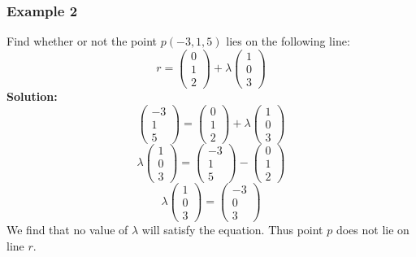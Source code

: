 \documentclass[hidelinks, a4paper, 12pt]{article}
\newcommand{\bd}{\textbf}
\begin{document}
            \subsubsection{Example 2}
                Find whether or not the point $p(-3, 1, 5)$ lies on the following line:
                \[r = \begin{pmatrix} 0 \\ 1 \\ 2 \end{pmatrix} + \lambda \begin{pmatrix} 1 \\ 0 \\ 3 \end{pmatrix}\]
                \bd{Solution:}
                \[\begin{pmatrix} -3 \\ 1 \\ 5 \end{pmatrix} = \begin{pmatrix} 0 \\ 1 \\ 2 \end{pmatrix} + \lambda \begin{pmatrix} 1 \\ 0 \\ 3 \end{pmatrix}\]
                \[\lambda \begin{pmatrix} 1 \\ 0 \\ 3 \end{pmatrix} = \begin{pmatrix} -3 \\ 1 \\ 5 \end{pmatrix} - \begin{pmatrix} 0 \\ 1 \\ 2 \end{pmatrix}\]
                \[\lambda \begin{pmatrix} 1 \\ 0 \\ 3 \end{pmatrix} = \begin{pmatrix} -3 \\ 0 \\ 3 \end{pmatrix}\]
                We find that no value of $\lambda$ will satisfy the equation. Thus point $p$ does not lie on line $r$.
\end{document}
